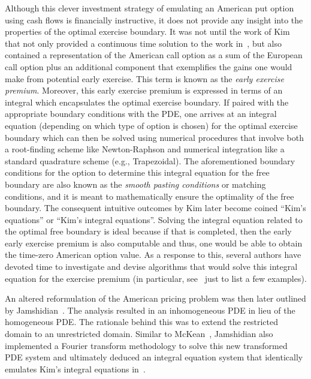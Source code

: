 Although this clever investment strategy of emulating an American put option using cash flows is financially instructive, it does not provide any insight into the properties of the optimal exercise boundary. It was not until the work of Kim~\cite{Kim1990} that not only provided a continuous time solution to the work in~\cite{Geske1984}, but also contained a representation of the American call option as a sum of the European call option plus an additional component that exemplifies the gains one would make from potential early exercise. This term is known as the \emph{early exercise premium}. Moreover, this early exercise premium is expressed in terms of an integral which encapsulates the optimal exercise boundary. If paired with the appropriate boundary conditions with the PDE, one arrives at an integral equation (depending on which type of option is chosen) for the optimal exercise boundary which can then be solved using numerical procedures that involve both a root-finding scheme like Newton-Raphson and numerical integration like a standard quadrature scheme (e.g., Trapezoidal). The aforementioned boundary conditions for the option to determine this integral equation for the free boundary are also known as the \emph{smooth pasting conditions} or matching conditions, and it is meant to mathematically ensure the optimality of the free boundary. The consequent intuitive outcomes by Kim later become coined ``Kim's equations'' or ``Kim's integral equations''. Solving the integral equation related to the optimal free boundary is ideal because if that is completed, then the early early exercise premium is also computable and thus, one would be able to obtain the time-zero American option value. As a response to this, several authors have devoted time to investigate and devise algorithms that would solve this integral equation for the exercise premium (in particular, see~\cite{Huang1996, Press1992, Sevcovic2001} just to list a few examples). 

An altered reformulation of the American pricing problem was then later outlined by Jamshidian~\cite{Jamshidian1992}. The analysis resulted in an inhomogeneous PDE in lieu of the homogeneous PDE. The rationale behind this was to extend the restricted domain to an unrestricted domain. Similar to McKean~\cite{McKean1965}, Jamshidian also implemented a Fourier transform methodology to solve this new transformed PDE system and ultimately deduced an integral equation system that identically emulates Kim's integral equations in~\cite{Kim1990}.

